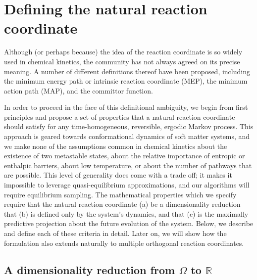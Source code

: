 \documentclass[aip, jcp, reprint, nolinenumbers, twocolumn, nobalancelastpage]{revtex4-1}
\begin{document}
\section{Defining the natural reaction coordinate}

Although (or perhaps because) the idea of the reaction coordinate is so widely used in chemical kinetics, the community has not always agreed on its precise meaning. A number of different definitions thereof have been proposed, including the minimum energy path or intrinsic reaction coordinate (MEP),\cite{fukui1970formulation, tachibana1980novel, quapp1984analysis, yamashita1981irc} the minimum action path (MAP),\cite{olender1997yet, heymann2008geometric, eastman2001simulation, ren2004minimum, lipfert2005protein} and the committor function.\cite{Bolhuis2002TRANSITION, dellago2002transition}

In order to proceed in the face of this definitional ambiguity, we begin from first principles and propose a set of properties that a natural reaction coordinate should satisfy for any time-homogeneous, reversible, ergodic Markov process. This approach is geared towards conformational dynamics of soft matter systems, and we make none of the assumptions common in chemical kinetics about the existence of two metastable states, about the relative importance of entropic or enthalpic barriers, about low temperature, or about the number of pathways that are possible. This level of generality does come with a trade off; it makes it impossible to leverage quasi-equilibrium approximations, and our algorithms will require equilibrium sampling. The mathematical properties which we specify require that the natural reaction coordinate (a) be a dimensionality reduction that (b) is defined only by the system's dynamics, and that (c) is the maximally predictive projection about the future evolution of the system. Below, we describe and define each of these criteria in detail.
Later on, we will show how the formulation also extends naturally to multiple orthogonal reaction coordinates.

\subsection{A dimensionality reduction from $\Omega$ to $\mathbb{R}$}
\end{document}
